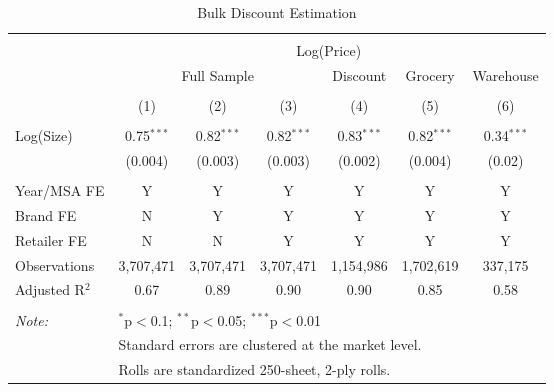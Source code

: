 
\begin{table}[!htbp] \centering 
  \caption{Bulk Discount Estimation} 
  \label{tab:bulkDiscount} 
\begin{tabular}{@{\extracolsep{5pt}}lcccccc} 
\\[-1.8ex]\hline 
\hline \\[-1.8ex] 
 & \multicolumn{6}{c}{Log(Price)} \\ 
\cline{2-7} 
 & \multicolumn{3}{c}{Full Sample} & Discount & Grocery & Warehouse \\ 
\\[-1.8ex] & (1) & (2) & (3) & (4) & (5) & (6)\\ 
\hline \\[-1.8ex] 
 Log(Size) & 0.75$^{***}$ & 0.82$^{***}$ & 0.82$^{***}$ & 0.83$^{***}$ & 0.82$^{***}$ & 0.34$^{***}$ \\ 
  & (0.004) & (0.003) & (0.003) & (0.002) & (0.004) & (0.02) \\ 
 \hline \\[-1.8ex] 
Year/MSA FE & Y & Y & Y & Y & Y & Y \\ 
Brand FE & N & Y & Y & Y & Y & Y \\ 
Retailer FE & N & N & Y & Y & Y & Y \\ 
Observations & 3,707,471 & 3,707,471 & 3,707,471 & 1,154,986 & 1,702,619 & 337,175 \\ 
Adjusted R$^{2}$ & 0.67 & 0.89 & 0.90 & 0.90 & 0.85 & 0.58 \\ 
\hline 
\hline \\[-1.8ex] 
\textit{Note:}  & \multicolumn{6}{l}{$^{*}$p$<$0.1; $^{**}$p$<$0.05; $^{***}$p$<$0.01} \\ 
 & \multicolumn{6}{l}{Standard errors are clustered at the market level.} \\ 
 & \multicolumn{6}{l}{Rolls are standardized 250-sheet, 2-ply rolls.} \\ 
\end{tabular} 
\end{table} 
